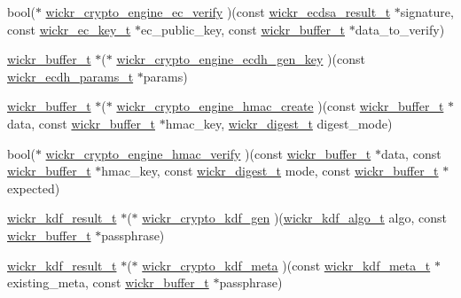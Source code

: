 \begin{DoxyCompactItemize}
\item 
bool($\ast$ \mbox{\hyperlink{group__wickr__crypto__engine_gae541acc6433f6f5ffe84382ccd5e4f97}{wickr\+\_\+crypto\+\_\+engine\+\_\+ec\+\_\+verify}} )(const \mbox{\hyperlink{structwickr__ecdsa__result}{wickr\+\_\+ecdsa\+\_\+result\+\_\+t}} $\ast$signature, const \mbox{\hyperlink{structwickr__ec__key}{wickr\+\_\+ec\+\_\+key\+\_\+t}} $\ast$ec\+\_\+public\+\_\+key, const \mbox{\hyperlink{structwickr__buffer}{wickr\+\_\+buffer\+\_\+t}} $\ast$data\+\_\+to\+\_\+verify)
\item 
\mbox{\hyperlink{structwickr__buffer}{wickr\+\_\+buffer\+\_\+t}} $\ast$($\ast$ \mbox{\hyperlink{group__wickr__crypto__engine_ga94bdc8d3b88ac04b9defe663afa48e78}{wickr\+\_\+crypto\+\_\+engine\+\_\+ecdh\+\_\+gen\+\_\+key}} )(const \mbox{\hyperlink{structwickr__ecdh__params}{wickr\+\_\+ecdh\+\_\+params\+\_\+t}} $\ast$params)
\item 
\mbox{\hyperlink{structwickr__buffer}{wickr\+\_\+buffer\+\_\+t}} $\ast$($\ast$ \mbox{\hyperlink{group__wickr__crypto__engine_ga782e0e8786ecf8a55c8ae2aea2f178aa}{wickr\+\_\+crypto\+\_\+engine\+\_\+hmac\+\_\+create}} )(const \mbox{\hyperlink{structwickr__buffer}{wickr\+\_\+buffer\+\_\+t}} $\ast$data, const \mbox{\hyperlink{structwickr__buffer}{wickr\+\_\+buffer\+\_\+t}} $\ast$hmac\+\_\+key, \mbox{\hyperlink{structwickr__digest}{wickr\+\_\+digest\+\_\+t}} digest\+\_\+mode)
\item 
bool($\ast$ \mbox{\hyperlink{group__wickr__crypto__engine_ga00c52a816403192af5b21d952265d0b6}{wickr\+\_\+crypto\+\_\+engine\+\_\+hmac\+\_\+verify}} )(const \mbox{\hyperlink{structwickr__buffer}{wickr\+\_\+buffer\+\_\+t}} $\ast$data, const \mbox{\hyperlink{structwickr__buffer}{wickr\+\_\+buffer\+\_\+t}} $\ast$hmac\+\_\+key, const \mbox{\hyperlink{structwickr__digest}{wickr\+\_\+digest\+\_\+t}} mode, const \mbox{\hyperlink{structwickr__buffer}{wickr\+\_\+buffer\+\_\+t}} $\ast$expected)
\item 
\mbox{\hyperlink{structwickr__kdf__result}{wickr\+\_\+kdf\+\_\+result\+\_\+t}} $\ast$($\ast$ \mbox{\hyperlink{group__wickr__crypto__engine_ga5ab29968c993423df83c9f1a3d7e685d}{wickr\+\_\+crypto\+\_\+kdf\+\_\+gen}} )(\mbox{\hyperlink{structwickr__kdf__algo}{wickr\+\_\+kdf\+\_\+algo\+\_\+t}} algo, const \mbox{\hyperlink{structwickr__buffer}{wickr\+\_\+buffer\+\_\+t}} $\ast$passphrase)
\item 
\mbox{\hyperlink{structwickr__kdf__result}{wickr\+\_\+kdf\+\_\+result\+\_\+t}} $\ast$($\ast$ \mbox{\hyperlink{group__wickr__crypto__engine_ga640cbc86ca36c4deb2c197de89dce7d1}{wickr\+\_\+crypto\+\_\+kdf\+\_\+meta}} )(const \mbox{\hyperlink{structwickr__kdf__meta}{wickr\+\_\+kdf\+\_\+meta\+\_\+t}} $\ast$existing\+\_\+meta, const \mbox{\hyperlink{structwickr__buffer}{wickr\+\_\+buffer\+\_\+t}} $\ast$passphrase)
\end{DoxyCompactItemize}


